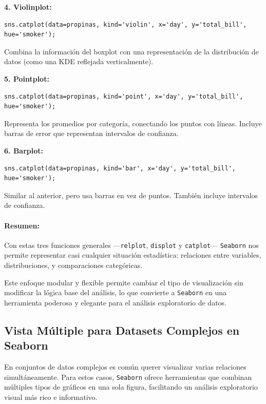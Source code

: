 \documentclass{article}
\theoremstyle{nonumberplain}
\begin{document}
\textbf{4. Violinplot:}
\begin{verbatim}
sns.catplot(data=propinas, kind='violin', x='day', y='total_bill', hue='smoker');
\end{verbatim}

Combina la información del boxplot con una representación de la distribución de datos (como una KDE reflejada verticalmente).

\textbf{5. Pointplot:}
\begin{verbatim}
sns.catplot(data=propinas, kind='point', x='day', y='total_bill', hue='smoker');
\end{verbatim}

Representa los promedios por categoría, conectando los puntos con líneas. Incluye barras de error que representan intervalos de confianza.

\textbf{6. Barplot:}
\begin{verbatim}
sns.catplot(data=propinas, kind='bar', x='day', y='total_bill', hue='smoker');
\end{verbatim}

Similar al anterior, pero usa barras en vez de puntos. También incluye intervalos de confianza.

\vspace{1em}
\paragraph{Resumen:}

Con estas tres funciones generales —\texttt{relplot}, \texttt{displot} y \texttt{catplot}— \texttt{Seaborn} nos permite representar casi cualquier situación estadística: relaciones entre variables, distribuciones, y comparaciones categóricas.

Este enfoque modular y flexible permite cambiar el tipo de visualización sin modificar la lógica base del análisis, lo que convierte a \texttt{Seaborn} en una herramienta poderosa y elegante para el análisis exploratorio de datos.


\subsection*{Vista Múltiple para Datasets Complejos en Seaborn}

En conjuntos de datos complejos es común querer visualizar varias relaciones simultáneamente. Para estos casos, \texttt{Seaborn} ofrece herramientas que combinan múltiples tipos de gráficos en una sola figura, facilitando un análisis exploratorio visual más rico e informativo.
\end{document}
